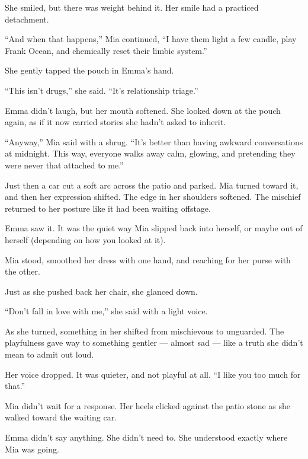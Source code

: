 She smiled, but there was weight behind it. Her smile had a practiced detachment.

``And when that happens,'' Mia continued, ``I have them light a few candle, 
play Frank Ocean, and chemically reset their limbic system.''

She gently tapped the pouch in Emma’s hand.

``This isn’t drugs,'' she said. ``It’s relationship triage.''

Emma didn’t laugh, but her mouth softened. She looked down at the pouch again,
as if it now carried stories she hadn’t asked to inherit.

``Anyway,'' Mia said with a shrug. ``It's better than having awkward conversations 
at midnight. This way, everyone walks away calm, glowing, and pretending they were
never that attached to me.''

Just then a car cut a soft arc across the patio and parked. Mia turned toward it, and
then her expression shifted.
The edge in her shoulders softened. The mischief returned to her posture like it had 
been waiting offstage.

Emma saw it. It was the quiet way Mia slipped back into herself, or maybe out of herself
(depending on how you looked at it).

Mia stood, smoothed her dress with one hand, and reaching for her purse with the other.

Just as she pushed back her chair, she glanced down.

``Don’t fall in love with me,'' she said with a light voice. 

As she turned, something in her shifted from mischievous to unguarded. 
The playfulness gave way to something gentler --- almost sad --- like a truth she didn’t 
mean to admit out loud.

Her voice dropped. It was quieter, and not playful at all.
``I like you too much for that.''

Mia didn’t wait for a response. Her heels clicked against the patio stone as she walked 
toward the waiting car.

Emma didn’t say anything. She didn’t need to.
She understood exactly where Mia was going.



